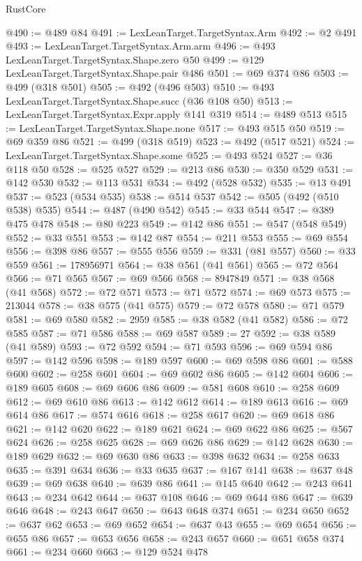 \begin{lexlean}{RustCore}
\begin{coremodule}
@490 := @489 @84
@491 := LexLeanTarget.TargetSyntax.Arm
@492 := @2 @491
@493 := LexLeanTarget.TargetSyntax.Arm.arm
@496 := @493 LexLeanTarget.TargetSyntax.Shape.zero @50
@499 := @129 LexLeanTarget.TargetSyntax.Shape.pair @486
@501 := @69 @374 @86
@503 := @499 (@318 @501)
@505 := @492 (@496 @503)
@510 := @493 LexLeanTarget.TargetSyntax.Shape.succ (@36 @108 @50)
@513 := LexLeanTarget.TargetSyntax.Expr.apply @141 @319
@514 := @489 @513
@515 := LexLeanTarget.TargetSyntax.Shape.none
@517 := @493 @515 @50
@519 := @69 @359 @86
@521 := @499 (@318 @519)
@523 := @492 (@517 @521)
@524 := LexLeanTarget.TargetSyntax.Shape.some
@525 := @493 @524
@527 := @36 @118 @50
@528 := @525 @527
@529 := @213 @86
@530 := @350 @529
@531 := @142 @530
@532 := @113 @531
@534 := @492 (@528 @532)
@535 := @13 @491
@537 := @523 (@534 @535)
@538 := @514 @537
@542 := @505 (@492 (@510 @538) @535)
@544 := @487 (@490 @542)
@545 := @33 @544
@547 := @389 @475 @478
@548 := @80 @223
@549 := @142 @86
@551 := @547 (@548 @549)
@552 := @33 @551
@553 := @142 @87
@554 := @211 @553
@555 := @69 @554
@556 := @398 @86
@557 := @555 @556
@559 := @331 (@81 @557)
@560 := @33 @559
@561 := 178956971
@564 := @38 @561 (@41 @561)
@565 := @72 @564
@566 := @71 @565
@567 := @69 @566
@568 := 8947849
@571 := @38 @568 (@41 @568)
@572 := @72 @571
@573 := @71 @572
@574 := @69 @573
@575 := 213044
@578 := @38 @575 (@41 @575)
@579 := @72 @578
@580 := @71 @579
@581 := @69 @580
@582 := 2959
@585 := @38 @582 (@41 @582)
@586 := @72 @585
@587 := @71 @586
@588 := @69 @587
@589 := 27
@592 := @38 @589 (@41 @589)
@593 := @72 @592
@594 := @71 @593
@596 := @69 @594 @86
@597 := @142 @596
@598 := @189 @597
@600 := @69 @598 @86
@601 := @588 @600
@602 := @258 @601
@604 := @69 @602 @86
@605 := @142 @604
@606 := @189 @605
@608 := @69 @606 @86
@609 := @581 @608
@610 := @258 @609
@612 := @69 @610 @86
@613 := @142 @612
@614 := @189 @613
@616 := @69 @614 @86
@617 := @574 @616
@618 := @258 @617
@620 := @69 @618 @86
@621 := @142 @620
@622 := @189 @621
@624 := @69 @622 @86
@625 := @567 @624
@626 := @258 @625
@628 := @69 @626 @86
@629 := @142 @628
@630 := @189 @629
@632 := @69 @630 @86
@633 := @398 @632
@634 := @258 @633
@635 := @391 @634
@636 := @33 @635
@637 := @167 @141
@638 := @637 @48
@639 := @69 @638
@640 := @639 @86
@641 := @145 @640
@642 := @243 @641
@643 := @234 @642
@644 := @637 @108
@646 := @69 @644 @86
@647 := @639 @646
@648 := @243 @647
@650 := @643 @648 @374
@651 := @234 @650
@652 := @637 @62
@653 := @69 @652
@654 := @637 @43
@655 := @69 @654
@656 := @655 @86
@657 := @653 @656
@658 := @243 @657
@660 := @651 @658 @374
@661 := @234 @660
@663 := @129 @524 @478

\end{coremodule}
\end{lexlean}
